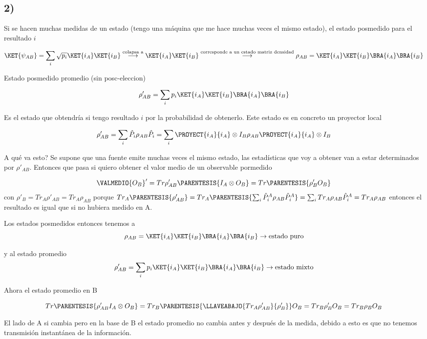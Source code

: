 \subsection*{2)}

Si se hacen muchas medidas de un estado (tengo una máquina que me
hace muchas veces el mismo estado), el estado posmedido para el resultado
$i$ 

\[
\KET{\psi_{AB}}=\sum_{i}\sqrt{p_{i}}\KET{i_{A}}\KET{i_{B}}\overset{\text{colapsa a}}{\longrightarrow}\KET{i_{A}}\KET{i_{B}}\overset{\text{corresponde a un estado matriz densidad}}{\longrightarrow}\rho_{AB}=\KET{i_{A}}\KET{i_{B}}\BRA{i_{A}}\BRA{i_{B}}
\]

Estado posmedido promedio (sin posc-eleccion) 

\[
\rho'_{AB}=\sum_{i}p_{i}\KET{i_{A}}\KET{i_{B}}\BRA{i_{A}}\BRA{i_{B}}
\]

Es el estado que obtendría si tengo resultado $i$ por la probabilidad
de obtenerlo. Este estado es en concreto un proyector local

\[
\rho'_{AB}=\sum_{i}\hat{P}_{i}\rho_{AB}\hat{P}_{i}=\sum_{i}\PROYECT{i_{A}}{i_{A}}\otimes I_{B}\rho_{AB}\PROYECT{i_{A}}{i_{A}}\otimes I_{B}
\]

A qué va esto? Se supone que una fuente emite muchas veces el mismo
estado, las estadísticas que voy a obtener van a estar determinados
por $\rho'_{AB}$. Entonces que pasa si quiero obtener el valor medio
de un observable pormedido

\[
\VALMEDIO{O_{B}}'=Tr\rho'_{AB}\PARENTESIS{I_{A}\otimes O_{B}}=Tr\PARENTESIS{\rho'_{B}O_{B}}
\]
con $\rho'_{B}=Tr_{A}\rho'_{AB}=Tr_{A}\rho_{AB}$ porque $Tr_{A}\PARENTESIS{\rho'_{AB}}=Tr_{A}\PARENTESIS{\sum_{i}\hat{P}_{i}^{A}\rho_{AB}\hat{P}_{i}^{A}}=\sum_{i}Tr_{A}\rho_{AB}\hat{P}_{i}^{A}=Tr_{A}\rho_{AB}$
entonces el resultado es igual que si no hubiera medido en A.

Los estados posmedidos entonces tenemos a 
\[
\rho_{AB}=\KET{i_{A}}\KET{i_{B}}\BRA{i_{A}}\BRA{i_{B}}\rightarrow\text{estado puro}
\]

y al estado promedio 
\[
\rho'_{AB}=\sum_{i}p_{i}\KET{i_{A}}\KET{i_{B}}\BRA{i_{A}}\BRA{i_{B}}\rightarrow\text{estado mixto}
\]

Ahora el estado promedio en B

\[
Tr\PARENTESIS{\rho'_{AB}I_{A}\otimes O_{B}}=Tr_{B}\PARENTESIS{\LLAVEABAJO{Tr_{A}\rho'_{AB}}{\rho'_{B}}}O_{B}=Tr_{B}\rho'_{B}O_{B}=Tr_{B}\rho_{B}O_{B}
\]

El lado de A si cambia pero en la base de B el estado promedio no
cambia antes y después de la medida, debido a esto es que no tenemos
transmisión instantánea de la información. 

